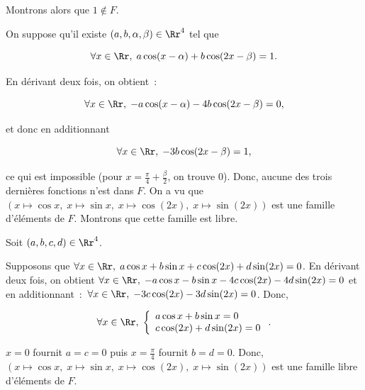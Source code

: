 {\begin{enumerate}
{Montrons alors que $1\notin F$.

On suppose qu'il existe $(a,b,\alpha,\beta)\in\Rr^4$ tel que

$$\forall x\in\Rr,\;a\cos(x-\alpha)+b\cos(2x-\beta)=1.$$

En dérivant deux fois, on obtient~:

$$\forall x\in\Rr,\;-a\cos(x-\alpha)-4b\cos(2x-\beta)=0,$$

et donc en additionnant

$$\forall x\in\Rr,\;-3b\cos(2x-\beta)=1,$$

ce qui est impossible (pour $x=\frac{\pi}{4}+\frac{\beta}{2}$, on trouve $0$). Donc, aucune des trois
dernières fonctions n'est dans $F$.
On a vu que $(x\mapsto\cos x,\;x\mapsto\sin x,\;x\mapsto\cos(2x),\;x\mapsto\sin(2x))$ est une famille
d'éléments de $F$. Montrons que cette famille est libre.

Soit $(a,b,c,d)\in\Rr^4$.

Supposons que $\forall x\in\Rr,\;a\cos x+b\sin x+c\cos(2x)+d\sin(2x)=0$. En dérivant deux fois, on obtient $\forall
x\in\Rr,\;-a\cos x-b\sin x-4c\cos(2x)-4d\sin(2x)=0$ et en additionnant~:~$\forall
x\in\Rr,\;-3c\cos(2x)-3d\sin(2x)=0$. Donc,

$$\forall x\in\Rr,\;\left\{
\begin{array}{l}
a\cos x+b\sin x=0\\
c\cos(2x)+d\sin(2x)=0
\end{array}
\right..$$

$x=0$ fournit $a=c=0$ puis $x=\frac{\pi}{4}$ fournit $b=d=0$. Donc, $(x\mapsto\cos x,\;x\mapsto\sin
x,\;x\mapsto\cos(2x),\;x\mapsto\sin(2x))$ est une famille libre d'éléments de $F$.
}
\end{enumerate}
}
